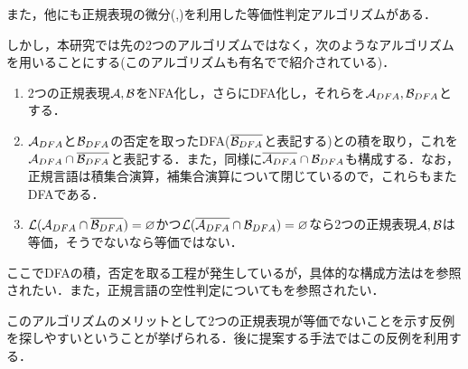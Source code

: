 \documentclass[a4paper, 12pt, dvipdfmx, uplatex]{jsreport}
\begin{document}
また，他にも正規表現の微分(\cite{regex_de1},\cite{regex_de2})を利用した等価性判定アルゴリズム\cite{regex_eq_de}がある．

しかし，本研究では先の2つのアルゴリズムではなく，次のようなアルゴリズムを用いることにする(このアルゴリズムも有名で\cite{sipser}で紹介されている)．

\begin{enumerate}
  \item 2つの正規表現$\mathcal{A},\mathcal{B}$をNFA化し，さらにDFA化し，それらを$\mathcal{A}_{DFA},\mathcal{B}_{DFA}$とする．
  \item $\mathcal{A}_{DFA}$と$\mathcal{B}_{DFA}$の否定を取ったDFA($\overline{\mathcal{B}_{DFA}}$と表記する)との積を取り，これを$\mathcal{A}_{DFA}\cap\overline{\mathcal{B}_{DFA}}$と表記する．また，同様に$\overline{\mathcal{A}_{DFA}}\cap\mathcal{B}_{DFA}$も構成する．なお，正規言語は積集合演算，補集合演算について閉じているので，これらもまたDFAである．
  \item $\mathcal{L}(\mathcal{A}_{DFA}\cap\overline{\mathcal{B}_{DFA}})=\varnothing$かつ$\mathcal{L}(\overline{\mathcal{A}_{DFA}}\cap\mathcal{B}_{DFA})=\varnothing$なら2つの正規表現$\mathcal{A},\mathcal{B}$は等価，そうでないなら等価ではない．
\end{enumerate}

ここでDFAの積，否定を取る工程が発生しているが，具体的な構成方法は\cite{sipser}を参照されたい．また，正規言語の空性判定についても\cite{sipser}を参照されたい．

このアルゴリズムのメリットとして2つの正規表現が等価でないことを示す反例を探しやすいということが挙げられる．後に提案する手法ではこの反例を利用する．



% 
% 
\end{document}
